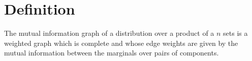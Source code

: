 

\section*{Definition}

The mutual information graph of a distribution over a product of a $n$ sets is a weighted graph which is complete and whose edge weights are given by the mutual information between the marginals over pairs of components.

\blankpage